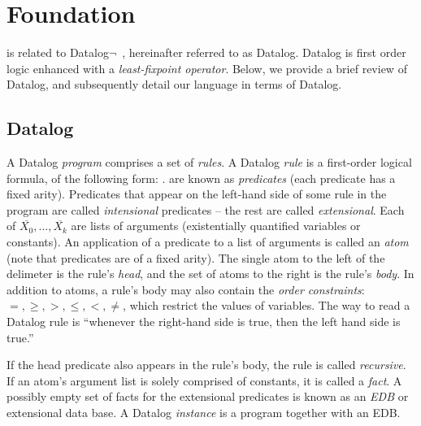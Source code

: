 \section{Foundation}
\label{sec:lang}

\lang is related to Datalog$\lnot$~\cite{ullmanbook}, hereinafter referred to as Datalog.  Datalog is first order logic enhanced with a {\em least-fixpoint operator}.  Below, we provide a brief review of Datalog, and subsequently detail our language in terms of Datalog.

\subsection{Datalog}
\label{sec:datalog}

A Datalog {\em program} comprises a set of {\em rules}.  A Datalog {\em rule} is a first-order logical formula, of the following form: .   are known as {\em predicates} (each predicate has a fixed arity).  Predicates that appear on the left-hand side of some rule in the program are called {\em intensional} predicates -- the rest are called {\em extensional}.  Each of $\overline{X_0}, ..., \overline{X_k}$ are lists of arguments (existentially quantified variables or constants).  An application of a predicate to a list of arguments is called an {\em atom} (note that predicates are of a fixed arity).  The single atom to the left of the \dedalus{:-} delimeter is the rule's {\em head}, and the set of atoms to the right is the rule's {\em body}.  In addition to atoms, a rule's body may also contain the {\em order constraints}: $=, \geq, >, \leq, <, \neq$, which restrict the values of variables.  The way to read a Datalog rule is ``whenever the right-hand side is true, then the left hand side is true.''

If the head predicate also appears in the rule's body, the rule is called {\em recursive}.  If an atom's argument list is solely comprised of constants, it is called a {\em fact}.  A possibly empty set of facts for the extensional predicates is known as an {\em EDB} or extensional data base.  A Datalog {\em instance} is a program together with an EDB.


